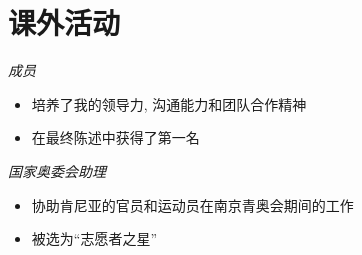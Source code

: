\section{课外活动}
\textit{成员}
\begin{itemize}
  \item 培养了我的领导力, 沟通能力和团队合作精神
  \item 在最终陈述中获得了第一名
\end{itemize}

\textit{国家奥委会助理}
\begin{itemize}
  \item 协助肯尼亚的官员和运动员在南京青奥会期间的工作
  \item 被选为``志愿者之星''
\end{itemize}